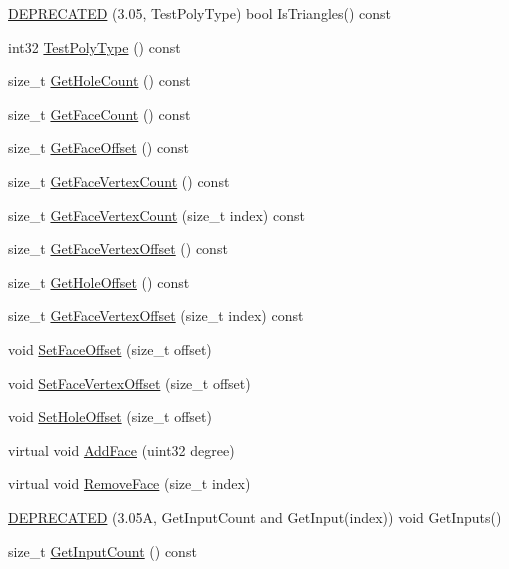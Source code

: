 \begin{DoxyCompactItemize}
\hyperlink{classFCDGeometryPolygons_ada1781d31ec1eefc4883f34e843f308c}{DEPRECATED} (3.05, TestPolyType) bool IsTriangles() const 
\item 
int32 \hyperlink{classFCDGeometryPolygons_ab7abd4ecf390204404de7e122f92cf42}{TestPolyType} () const 
\item 
size\_\-t \hyperlink{classFCDGeometryPolygons_a3fae32cddb26fdda38ed0780742994f5}{GetHoleCount} () const 
\item 
size\_\-t \hyperlink{classFCDGeometryPolygons_a8c3d81ca40de775180955f60136443be}{GetFaceCount} () const 
\item 
size\_\-t \hyperlink{classFCDGeometryPolygons_a5030ae9c26ce1a0eb657b1e9c407d095}{GetFaceOffset} () const 
\item 
size\_\-t \hyperlink{classFCDGeometryPolygons_ad1d7724ee2ad523c046daf1578a02c41}{GetFaceVertexCount} () const 
\item 
size\_\-t \hyperlink{classFCDGeometryPolygons_a98f523078342d14909b6ff313fbc4a43}{GetFaceVertexCount} (size\_\-t index) const 
\item 
size\_\-t \hyperlink{classFCDGeometryPolygons_a3ca276bbd62799974de70225f8394ec2}{GetFaceVertexOffset} () const 
\item 
size\_\-t \hyperlink{classFCDGeometryPolygons_a0e095e2198011c34314770ecc0cdfe77}{GetHoleOffset} () const 
\item 
size\_\-t \hyperlink{classFCDGeometryPolygons_a83acf657c7b5fdc3757cdfb20a404318}{GetFaceVertexOffset} (size\_\-t index) const 
\item 
void \hyperlink{classFCDGeometryPolygons_af074c0123e8361063135c9454404d006}{SetFaceOffset} (size\_\-t offset)
\item 
void \hyperlink{classFCDGeometryPolygons_a591b64e48b4fc166e14eb4489bc1814c}{SetFaceVertexOffset} (size\_\-t offset)
\item 
void \hyperlink{classFCDGeometryPolygons_ade33e2cbf8a9eddd93803dc142077821}{SetHoleOffset} (size\_\-t offset)
\item 
virtual void \hyperlink{classFCDGeometryPolygons_a9e578e49c066fc57e5f74a62ecd1b104}{AddFace} (uint32 degree)
\item 
virtual void \hyperlink{classFCDGeometryPolygons_ae8e0ee226f5f038151c0eb383ab4a9cd}{RemoveFace} (size\_\-t index)
\item 
\hyperlink{classFCDGeometryPolygons_a3cf3679faae04bb130943c0ed2be4d63}{DEPRECATED} (3.05A, GetInputCount and GetInput(index)) void GetInputs()
\item 
size\_\-t \hyperlink{classFCDGeometryPolygons_ac74a72265b15e81bb947bf41228e722b}{GetInputCount} () const 

\end{DoxyCompactItemize}
